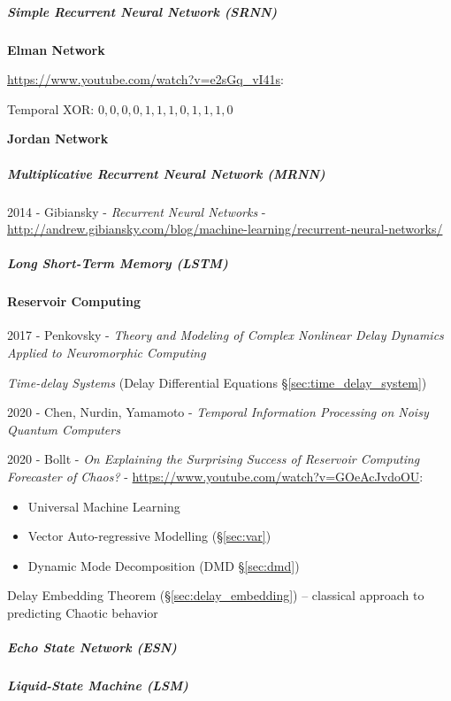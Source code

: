 \subparagraph{Simple Recurrent Neural Network (SRNN)}\label{sec:srnn}\hfill

\textbf{Elman Network}

\url{https://www.youtube.com/watch?v=e2sGq_vI41s}:

Temporal XOR:
$0, 0, 0, 0, 1, 1, 1, 0, 1, 1, 1, 0$


\textbf{Jordan Network}



\subparagraph{Multiplicative Recurrent Neural Network (MRNN)}\label{sec:mrnn}
\hfill

2014 - Gibiansky - \emph{Recurrent Neural Networks} -
\url{http://andrew.gibiansky.com/blog/machine-learning/recurrent-neural-networks/}



\subparagraph{Long Short-Term Memory (LSTM)}\label{sec:lstm}\hfill



\paragraph{Reservoir Computing}\label{sec:reservoir_computing}\hfill

2017 - Penkovsky - \emph{Theory and Modeling of Complex Nonlinear Delay Dynamics
  Applied to Neuromorphic Computing}

\emph{Time-delay Systems} (Delay Differential Equations
\S\ref{sec:time_delay_system})

2020 - Chen, Nurdin, Yamamoto - \emph{Temporal Information Processing on Noisy
  Quantum Computers}

2020 - Bollt - \emph{On Explaining the Surprising Success of Reservoir Computing
  Forecaster of Chaos?} - \url{https://www.youtube.com/watch?v=GOeAcJvdoOU}:

\begin{itemize}
  \item Universal Machine Learning
  \item Vector Auto-regressive Modelling (\S\ref{sec:var})
  \item Dynamic Mode Decomposition (DMD \S\ref{sec:dmd})
\end{itemize}

Delay Embedding Theorem (\S\ref{sec:delay_embedding}) -- classical approach to
predicting Chaotic behavior



\subparagraph{Echo State Network (ESN)}\label{sec:esn}\hfill

\subparagraph{Liquid-State Machine (LSM)}\label{sec:liquid_state}\hfill

